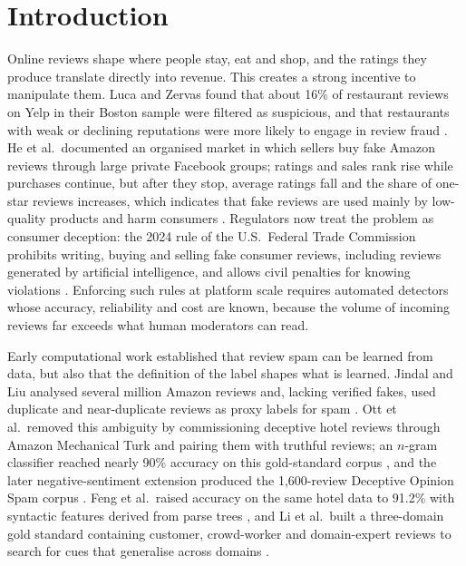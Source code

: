 \section{Introduction}
\label{sec:intro}
Online reviews shape where people stay, eat and shop, and the ratings they produce translate directly into revenue. This creates a strong incentive to manipulate them. Luca and Zervas found that about 16\% of restaurant reviews on Yelp in their Boston sample were filtered as suspicious, and that restaurants with weak or declining reputations were more likely to engage in review fraud \cite{luca2016}. He et al.\ documented an organised market in which sellers buy fake Amazon reviews through large private Facebook groups; ratings and sales rank rise while purchases continue, but after they stop, average ratings fall and the share of one-star reviews increases, which indicates that fake reviews are used mainly by low-quality products and harm consumers \cite{he2022market}. Regulators now treat the problem as consumer deception: the 2024 rule of the U.S.\ Federal Trade Commission prohibits writing, buying and selling fake consumer reviews, including reviews generated by artificial intelligence, and allows civil penalties for knowing violations \cite{ftc2024}. Enforcing such rules at platform scale requires automated detectors whose accuracy, reliability and cost are known, because the volume of incoming reviews far exceeds what human moderators can read.

Early computational work established that review spam can be learned from data, but also that the definition of the label shapes what is learned. Jindal and Liu analysed several million Amazon reviews and, lacking verified fakes, used duplicate and near-duplicate reviews as proxy labels for spam \cite{jindal2008}. Ott et al.\ removed this ambiguity by commissioning deceptive hotel reviews through Amazon Mechanical Turk and pairing them with truthful reviews; an $n$-gram classifier reached nearly 90\% accuracy on this gold-standard corpus \cite{ref22}, and the later negative-sentiment extension produced the 1,600-review Deceptive Opinion Spam corpus \cite{ott2013}. Feng et al.\ raised accuracy on the same hotel data to 91.2\% with syntactic features derived from parse trees \cite{feng2012}, and Li et al.\ built a three-domain gold standard containing customer, crowd-worker and domain-expert reviews to search for cues that generalise across domains \cite{li2014}.


